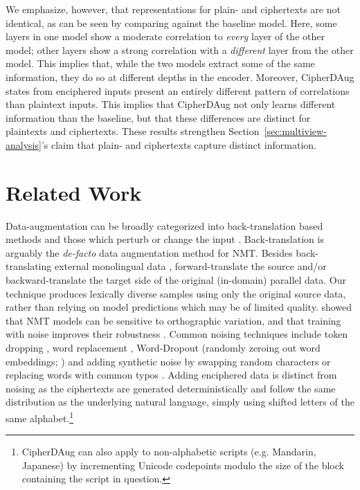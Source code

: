 \documentclass[11pt]{article}
\begin{document}
We emphasize, however, that representations for plain- and ciphertexts are not identical, as can be seen by comparing against the baseline model.
Here, some layers in one model show a moderate correlation to \textit{every} layer of the other model; other layers show a strong correlation with a \textit{different} layer from the other model. This implies that, while the two models extract some of the same information, they do so at different depths in the encoder. Moreover, CipherDAug states from enciphered inputs present an entirely different pattern of correlations than plaintext inputs. This implies that CipherDAug not only learns different information than the baseline, but that these differences are distinct for plaintexts and ciphertexts. 
These results strengthen Section~\ref{sec:multiview-analysis}'s claim that plain- and ciphertexts capture distinct information.

\section{Related Work}
Data-augmentation \cite{sennrich2016improving} can be broadly categorized into back-translation based methods and those which perturb or change the input \cite{wang-etal-2018-switchout}.
Back-translation \cite{sennrich2016improving} is arguably the \emph{de-facto} data augmentation method for NMT. Besides back-translating external monolingual data \cite{edunov2018understanding}, \citet{li-etal-2019-understanding} forward-translate the source \cite{zhang-zong-2016-exploiting} and/or backward-translate the target side \cite{sennrich-etal-2016-edinburgh} of the original (in-domain) parallel data. Our technique produces lexically diverse samples using only the original source data, rather than relying on model predictions which may be of limited quality.
\citet{belinkov2018synthetic} showed that NMT models can be sensitive to orthographic variation,
and that training with noise improves their robustness \cite{khayrallah2018impact}. Common noising techniques include token dropping \cite{zhang-etal-2020-token}, word replacement \cite{noising2017, wu-etal-2021-mixseq}, Word-Dropout (randomly zeroing out word embeddings; \citealt{sennrich-etal-2016-edinburgh, gal2016theoretically}) and adding synthetic noise by swapping random characters or replacing words with common typos \cite{karpukhin-etal-2019-training}. Adding enciphered data is distinct from noising as the ciphertexts are generated deterministically and follow the same distribution as the underlying natural language, simply using shifted letters of the same alphabet.\footnote{CipherDAug can also apply to non-alphabetic scripts (e.g. Mandarin, Japanese) by incrementing Unicode codepoints modulo the size of the block containing the script in question.} 
\end{document}
